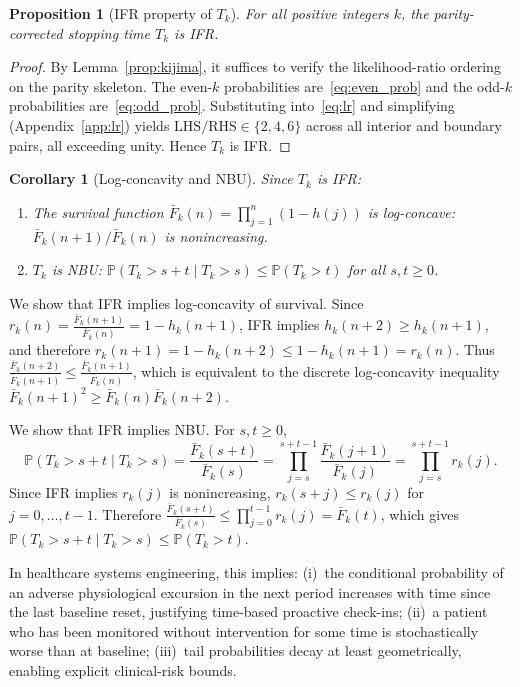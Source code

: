 \documentclass[pdflatex,sn-mathphys-num]{sn-jnl}
\newtheorem{proposition}[theorem]{Proposition}
\newtheorem{corollary}[theorem]{Corollary}
\theoremstyle{definition}
\newcommand{\Prob}{\mathbb{P}}
\numberwithin{equation}{section}
\begin{document}
\begin{proposition}[IFR property of $T_k$]\label{prop:IFR}
For all positive integers $k$, the parity-corrected stopping time $T_k$ is IFR.
\end{proposition}

\begin{proof}
By Lemma~\ref{prop:kijima}, it suffices to verify the likelihood-ratio ordering on the parity skeleton. The even-$k$ probabilities are~\eqref{eq:even_prob} and the odd-$k$ probabilities are~\eqref{eq:odd_prob}. Substituting into~\eqref{eq:lr} and simplifying (Appendix~\ref{app:lr}) yields $\text{LHS}/\text{RHS}\in\{2,4,6\}$ across all interior and boundary pairs, all exceeding unity. Hence $T_k$ is IFR.
\end{proof}

\begin{corollary}[Log-concavity and NBU]\label{cor:main}
Since $T_k$ is IFR:
\begin{enumerate}[label=(\roman*)]
\item The survival function $\bar{F}_k(n) = \prod_{j=1}^{n}(1-h(j))$ is log-concave: $\bar{F}_k(n{+}1)/\bar{F}_k(n)$ is nonincreasing.
\item $T_k$ is NBU: $\Prob(T_k>s{+}t\mid T_k>s)\le\Prob(T_k>t)$ for all $s,t\ge 0$.
\end{enumerate}
\end{corollary}

We show that IFR implies log-concavity of survival.
Since
$\displaystyle r_k(n)=\frac{\bar F_k(n+1)}{\bar F_k(n)}=1-h_k(n+1)$,
IFR implies
$\displaystyle h_k(n+2)\ge h_k(n+1)$,
and therefore
$\displaystyle r_k(n+1)=1-h_k(n+2)
\le
1-h_k(n+1)=r_k(n)$.
Thus
$\displaystyle \frac{\bar F_k(n+2)}{\bar F_k(n+1)}
\le
\frac{\bar F_k(n+1)}{\bar F_k(n)}$,
which is equivalent to the discrete log-concavity inequality
$\displaystyle \bar F_k(n+1)^2
\ge
\bar F_k(n)\bar F_k(n+2)$.

We show that IFR implies NBU.
For \(s,t\ge 0\),
\[
\Prob(T_k>s+t\mid T_k>s)
=
\frac{\bar F_k(s+t)}{\bar F_k(s)}
=
\prod_{j=s}^{s+t-1}
\frac{\bar F_k(j+1)}{\bar F_k(j)}
=
\prod_{j=s}^{s+t-1} r_k(j).
\]
Since IFR implies \(r_k(j)\) is nonincreasing,
$r_k(s+j)\le r_k(j)$ for $j=0,\ldots,t-1$.
Therefore
$\displaystyle \frac{\bar F_k(s+t)}{\bar F_k(s)}
\le
\prod_{j=0}^{t-1}r_k(j)
=
\bar F_k(t)$,
which gives
$\displaystyle \Prob(T_k>s+t\mid T_k>s)\le \Prob(T_k>t)$.

In healthcare systems engineering, this implies: (i)~the conditional probability of an adverse physiological excursion in the next period increases with time since the last baseline reset, justifying time-based proactive check-ins; (ii)~a patient who has been monitored without intervention for some time is stochastically worse than at baseline; (iii)~tail probabilities decay at least geometrically, enabling explicit clinical-risk bounds.
\end{document}
